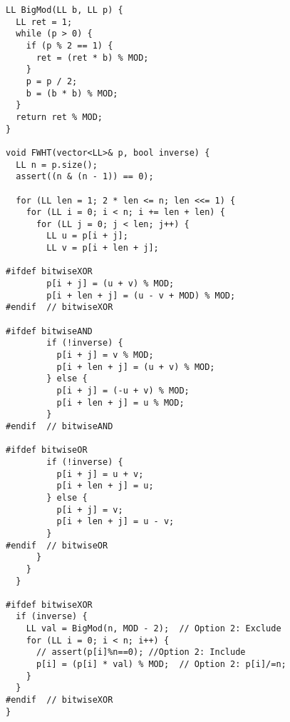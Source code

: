 \documentclass[FSZ,a4paper,onesided]{article}
\begin{document}
\begin{multicols*}{\COLS}
\begin{lstlisting}
LL BigMod(LL b, LL p) {
  LL ret = 1;
  while (p > 0) {
    if (p % 2 == 1) {
      ret = (ret * b) % MOD;
    }
    p = p / 2;
    b = (b * b) % MOD;
  }
  return ret % MOD;
}

void FWHT(vector<LL>& p, bool inverse) {
  LL n = p.size();
  assert((n & (n - 1)) == 0);

  for (LL len = 1; 2 * len <= n; len <<= 1) {
    for (LL i = 0; i < n; i += len + len) {
      for (LL j = 0; j < len; j++) {
        LL u = p[i + j];
        LL v = p[i + len + j];

#ifdef bitwiseXOR
        p[i + j] = (u + v) % MOD;
        p[i + len + j] = (u - v + MOD) % MOD;
#endif  // bitwiseXOR

#ifdef bitwiseAND
        if (!inverse) {
          p[i + j] = v % MOD;
          p[i + len + j] = (u + v) % MOD;
        } else {
          p[i + j] = (-u + v) % MOD;
          p[i + len + j] = u % MOD;
        }
#endif  // bitwiseAND

#ifdef bitwiseOR
        if (!inverse) {
          p[i + j] = u + v;
          p[i + len + j] = u;
        } else {
          p[i + j] = v;
          p[i + len + j] = u - v;
        }
#endif  // bitwiseOR
      }
    }
  }

#ifdef bitwiseXOR
  if (inverse) {
    LL val = BigMod(n, MOD - 2);  // Option 2: Exclude
    for (LL i = 0; i < n; i++) {
      // assert(p[i]%n==0); //Option 2: Include
      p[i] = (p[i] * val) % MOD;  // Option 2: p[i]/=n;
    }
  }
#endif  // bitwiseXOR
}
\end{lstlisting}

\end{multicols*}
\end{document}
